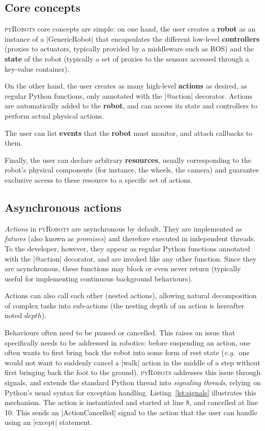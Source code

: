 \documentclass[letterpaper, 10pt, conference]{ieeeconf}      %
\newcommand{\eg}{{\textit{e.g.\ }}}
\newcommand{\pyRobots}{\textsc{pyRobots}}
\begin{document}
\subsection{Core concepts}

\pyRobots{} core concepts are simple: on one hand, the user creates a
\textbf{robot} as an instance of a \python|GenericRobot| that encapsulates the
different low-level \textbf{controllers} (proxies to actuators, typically
provided by a middleware such as ROS) and the \textbf{state} of the robot
(typically a set of proxies to the sensors accessed through a key-value
container).

On the other hand, the user creates as many high-level \textbf{actions} as
desired, as regular Python functions, only annotated with the \python|@action|
decorator. Actions are automatically added to the \textbf{robot}, and can access
its state and controllers to perform actual physical actions.

The user can list \textbf{events} that the \textbf{robot} must monitor, and
attach callbacks to them.

Finally, the user can declare arbitrary \textbf{resources}, usually
corresponding to the robot's physical components (for instance, the wheels, the
camera) and guarantee exclusive access to these resource to a specific set of
actions.

\subsection{Asynchronous actions}

\emph{Actions} in \pyRobots{} are asynchronous by default. They are implemented as
\emph{futures} (also known as \emph{promises}) and therefore executed in
independent threads. To the developer, however, they appear as regular Python
functions annotated with the \python|@action| decorator, and are invoked
like any other function.  Since they are asynchronous, these functions may
block or even never return (typically useful for implementing continuous
background behaviours).

Actions can also call each other (nested actions), allowing natural
decomposition of complex tasks into sub-actions (the nesting depth of an action
is hereafter noted $depth$).

Behaviours often need to be paused or cancelled.  This raises
an issue that specifically needs to be addressed in robotics: before suspending
an action, one often wants to first bring back the robot into some form of rest
state (\eg one would not want to suddenly cancel a \python|walk| action in the
middle of a step without first bringing back the foot to the ground). \pyRobots{}
addresses this issue through signals, and extends the standard Python thread into
\emph{signaling threads}, relying on Python's usual syntax for exception
handling. Listing~\ref{lst:signals} illustrates this mechanism. The action is
instantiated and started at line 8, and cancelled at line 10. This sends an
\python|ActionCancelled| signal to the action that the user can handle using an
\python|except| statement.
\end{document}
